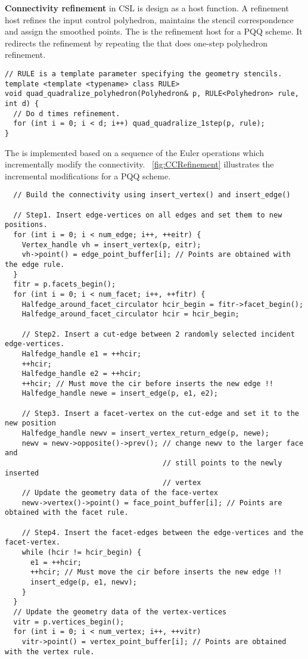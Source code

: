 \noindent \textbf{Connectivity refinement} in CSL is 
design as a host function. A refinement host refines the input 
control polyhedron, maintains the stencil correspondence 
and assign the smoothed points. 
The  is the refinement host
for a PQQ scheme. It redirects the refinement by 
repeating the  that does 
one-step polyhedron refinement.
\begin{lstlisting}
// RULE is a template parameter specifying the geometry stencils. 
template <template <typename> class RULE>
void quad_quadralize_polyhedron(Polyhedron& p, RULE<Polyhedron> rule, int d) {
  // Do d times refinement.
  for (int i = 0; i < d; i++) quad_quadralize_1step(p, rule);
}
\end{lstlisting}
The  is implemented
based on a sequence of the Euler operations which 
incrementally modify the connectivity.
\figurename\ \ref{fig:CCRefinement} illustrates the
incremental modifications for a PQQ scheme. 
\begin{lstlisting}
  // Build the connectivity using insert_vertex() and insert_edge()

  // Step1. Insert edge-vertices on all edges and set them to new positions.
  for (int i = 0; i < num_edge; i++, ++eitr) {
    Vertex_handle vh = insert_vertex(p, eitr);
    vh->point() = edge_point_buffer[i]; // Points are obtained with the edge rule.
  }
  fitr = p.facets_begin();
  for (int i = 0; i < num_facet; i++, ++fitr) {
    Halfedge_around_facet_circulator hcir_begin = fitr->facet_begin();
    Halfedge_around_facet_circulator hcir = hcir_begin;
    
    // Step2. Insert a cut-edge between 2 randomly selected incident edge-vertices.
    Halfedge_handle e1 = ++hcir;
    ++hcir; 
    Halfedge_handle e2 = ++hcir;
    ++hcir; // Must move the cir before inserts the new edge !!
    Halfedge_handle newe = insert_edge(p, e1, e2);
    
    // Step3. Insert a facet-vertex on the cut-edge and set it to the new position
    Halfedge_handle newv = insert_vertex_return_edge(p, newe);
    newv = newv->opposite()->prev(); // change newv to the larger face and 
                                     // still points to the newly inserted 
                                     // vertex
    // Update the geometry data of the face-vertex
    newv->vertex()->point() = face_point_buffer[i]; // Points are obtained with the facet rule.
   
    // Step4. Insert the facet-edges between the edge-vertices and the facet-vertex.
    while (hcir != hcir_begin) {
      e1 = ++hcir;
      ++hcir; // Must move the cir before inserts the new edge !!
      insert_edge(p, e1, newv); 
    }
  }
  // Update the geometry data of the vertex-vertices
  vitr = p.vertices_begin();
  for (int i = 0; i < num_vertex; i++, ++vitr) 
    vitr->point() = vertex_point_buffer[i]; // Points are obtained with the vertex rule.
\end{lstlisting}
